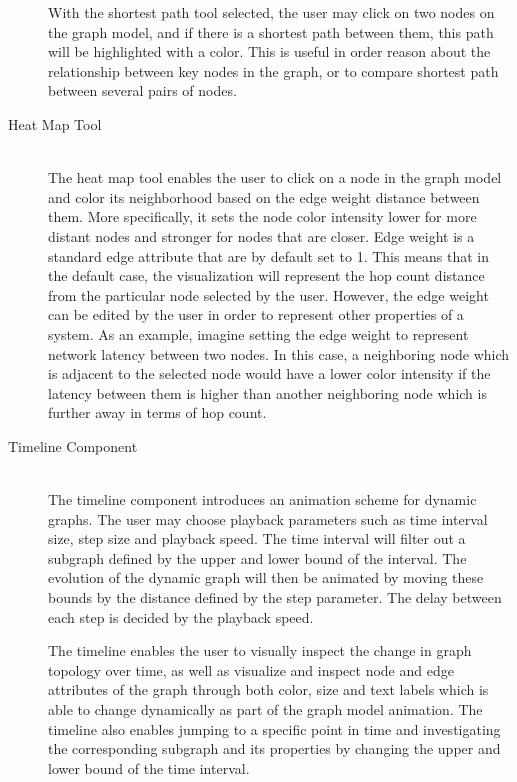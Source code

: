 \begin{description}
    With the shortest path tool selected, the user may click on two nodes on
    the graph model, and if there is a shortest path between them, this path
    will be highlighted with a color. This is useful in order reason about the
    relationship between key nodes in the graph, or to compare shortest path
    between several pairs of nodes.

\item[Heat Map Tool] \hfill \\

    The heat map tool enables the user to click on a node in the graph model
    and color its neighborhood based on the edge weight distance between
    them. More specifically, it sets the node color intensity lower for more
    distant nodes and stronger for nodes that are closer. Edge weight is a
    standard edge attribute that are by default set to 1. This means that in
    the default case, the visualization will represent the hop count
    distance from the particular node selected by the user. However, the
    edge weight can be edited by the user in order to represent other
    properties of a system. As an example, imagine setting the edge weight
    to represent network latency between two nodes. In this case, a
    neighboring node which is adjacent to the selected node would have a
    lower color intensity if the latency between them is higher than another
    neighboring node which is further away in terms of hop count.

\item[Timeline Component] \hfill \\

    The timeline component introduces an animation scheme for dynamic
    graphs. The user may choose playback parameters such as time
    interval size, step size and playback speed. The time interval will
    filter out a subgraph defined by the upper and lower bound of the
    interval. The evolution of the dynamic graph will then be animated
    by moving these bounds by the distance defined by the step
    parameter. The delay between each step is decided by the playback
    speed.

    The timeline enables the user to visually inspect the change in
    graph topology over time, as well as visualize and inspect node and
    edge attributes of the graph through both color, size and text
    labels which is able to change dynamically as part of the graph
    model animation. The timeline also enables jumping to a specific
    point in time and investigating the corresponding subgraph and its
    properties by changing the upper and lower bound of the time
    interval.


\end{description}
